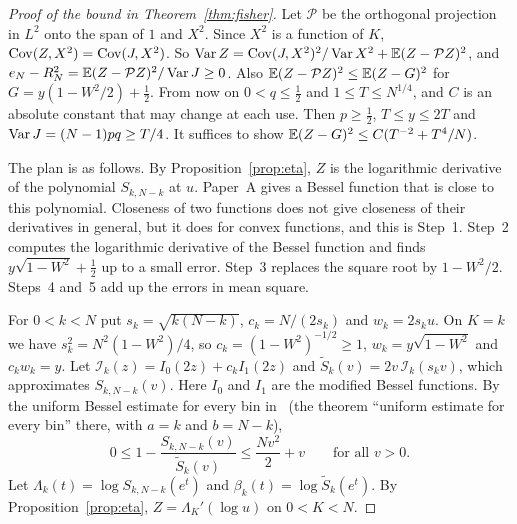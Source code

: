 \begin{proof}[Proof of the bound in Theorem~\ref{thm:fisher}]
Let $\mathcal P$ be the orthogonal projection in $L^2$ onto the span of $1$
and $X^2$. Since $X^2$ is a function of $K$, $\operatorname{Cov}(Z,X^2)=\operatorname{Cov}(J,X^2)$. So
$\operatorname{Var} Z=\operatorname{Cov}(J,X^2)^2/\operatorname{Var} X^2+\mathbb E(Z-\mathcal PZ)^2$, and
$e_N-R^2_N=\mathbb E(Z-\mathcal PZ)^2/\operatorname{Var} J\ge0$. Also
$\mathbb E(Z-\mathcal PZ)^2\le\mathbb E(Z-G)^2$ for $G=y(1-W^2/2)+\frac12$. From now on
$0<q\le\frac12$ and $1\le T\le N^{1/4}$, and $C$ is an absolute constant that
may change at each use. Then $p\ge\frac12$, $T\le y\le2T$ and
$\operatorname{Var} J=(N-1)pq\ge T/4$. It suffices to show
$\mathbb E(Z-G)^2\le C(T^{-2}+T^4/N)$.

The plan is as follows. By Proposition~\ref{prop:eta}, $Z$ is the logarithmic
derivative of the polynomial $S_{k,N-k}$ at $u$. Paper~A gives a Bessel
function that is close to this polynomial. Closeness of two functions does not
give closeness of their derivatives in general, but it does for convex
functions, and this is Step~1. Step~2 computes the logarithmic derivative of
the Bessel function and finds $y\sqrt{1-W^2}+\frac12$ up to a small error.
Step~3 replaces the square root by $1-W^2/2$. Steps~4 and~5 add up the errors
in mean square.

For $0<k<N$ put $s_k=\sqrt{k(N-k)}$, $c_k=N/(2s_k)$ and $w_k=2s_ku$. On
$K=k$ we have $s_k^2=N^2(1-W^2)/4$, so $c_k=(1-W^2)^{-1/2}\ge1$,
$w_k=y\sqrt{1-W^2}$ and $c_kw_k=y$. Let $\mathcal I_k(z)=I_0(2z)+c_kI_1(2z)$
and $\widetilde S_k(v)=2v\,\mathcal I_k(s_kv)$, which approximates
$S_{k,N-k}(v)$. Here $I_0$ and $I_1$ are the modified Bessel functions. By
the uniform Bessel estimate for every bin in~\cite{paperA} (the theorem
``uniform estimate for every bin'' there, with $a=k$ and $b=N-k$),
\begin{equation}\label{eq:fisher-bessel-bound}
 0\le1-\frac{S_{k,N-k}(v)}{\widetilde S_k(v)}\le\frac{Nv^2}2+v
 \qquad\text{for all }v>0 .
\end{equation}
Let $\Lambda_k(t)=\log S_{k,N-k}(e^t)$ and
$\beta_k(t)=\log\widetilde S_k(e^t)$. By Proposition~\ref{prop:eta},
$Z=\Lambda_K'(\log u)$ on $0<K<N$.


\end{proof}

